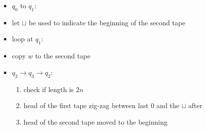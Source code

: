 \begin{frame}[allowframebreaks]
\begin{itemize}
\item $q_0$ to $q_1$:
  
\item [] let $\sqcup$ be used to indicate the beginning of the second
  tape
\item loop at $q_1$:
\item [] copy $w$ to the second tape
\item $q_2 \rightarrow q_3 \rightarrow q_2$: 
  \begin{enumerate}
  \item check if length is $2n$    
  \item head of the first tape zig-zag between last 0 and the
    $\sqcup$ after
  \item head of the second tape moved to the beginning
\end{enumerate}


\end{itemize}
\end{frame}
